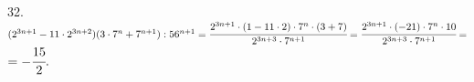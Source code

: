 32. $(2^{3n+1}-11\cdot2^{3n+2})(3\cdot7^n+7^{n+1}):56^{n+1}=\cfrac{2^{3n+1}\cdot(1-11\cdot2)\cdot7^n\cdot(3+7)}{2^{3n+3}\cdot7^{n+1}}=
\cfrac{2^{3n+1}\cdot(-21)\cdot7^n\cdot10}{2^{3n+3}\cdot7^{n+1}}=$\\$=-\cfrac{15}{2}.$\\
